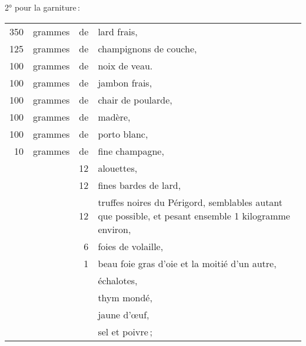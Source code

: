 2° pour la garniture :

\footnotesize
\begin{longtable}{rrrp{16em}}
    350 & grammes & de & lard frais,                                                                      \\
    125 & grammes & de & champignons de couche,                                                           \\
    100 & grammes & de & noix de veau.                                                                    \\
    100 & grammes & de & jambon frais,                                                                    \\
    100 & grammes & de & chair de poularde,                                                               \\
    100 & grammes & de & madère,                                                                          \\
    100 & grammes & de & porto blanc,                                                                     \\
     10 & grammes & de & fine champagne,                                                                  \\
        &         & 12 & alouettes,                                                                       \\
        &         & 12 & fines bardes de lard,                                                            \\
        &         & 12 & truffes noires du Périgord, semblables autant que possible,
                         et pesant ensemble 1 kilogramme environ,                                         \\
        &         &  6 & foies de volaille,                                                               \\
        &         &  1 & beau foie gras d’oie et la moitié d'un autre,                                    \\
        &         &    & échalotes,                                                                       \\
        &         &    & thym mondé,                                                                      \\
        &         &    & jaune d'œuf,                                                                     \\
        &         &    & sel et poivre ;                                                                  \\
\end{longtable}
\normalsize

